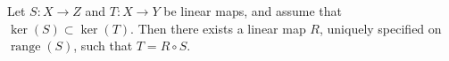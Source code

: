 Let $S: X \to Z$ and $T: X \to Y$ be linear maps, and assume that $\ker(S) \subset \ker(T)$. Then there exists a linear map $R$, uniquely specified on $\operatorname{range}(S)$, such that $T = R \circ S$.